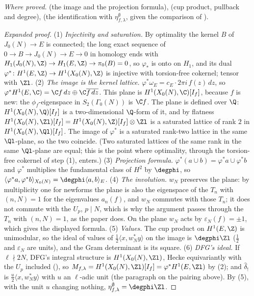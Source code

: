 \begin{sloppypar}
\noindent\emph{Where proved.}  (the image and the projection formula),  (cup product, pullback and degree),  (the
identification with $\eta^\emptyset_{f,\lambda}$, given the comparison of ).

\begin{proof}[Expanded proof]
(1) \emph{Injectivity and saturation.} By optimality the kernel $B$ of $J_0(N)\to E$ is connected; the long exact sequence of $0\to B\to J_0(N)\to E\to0$ in homology ends with
$H_1(J_0(N),\Z)\to H_1(E,\Z)\to\pi_0(B)=0$, so $\varphi_*$ is onto on $H_1$, and its dual $\varphi^*\colon H^1(E,\Z)\to H^1(X_0(N),\Z)$ is injective with torsion-free cokernel; tensor with $\Zl$.
(2) \emph{The image is the kernel lattice.} $\varphi^*\omega_E=c_E\cdot2\pi i\,f(z)\,dz$, so $\varphi^*H^1(E,\C)=\C f\,dz\oplus\C\overline{f\,dz}$. This plane is $H^1(X_0(N),\C)[I_f]$, because $f$ is new: the
$\phi_f$-eigenspace in $S_2(\Gamma_0(N))$ is $\C f$. The plane is defined over $\Q$: $H^1(X_0(N),\Q)[I_f]$ is a two-dimensional $\Q$-form of it, and by flatness
$H^1(X_0(N),\Zl)[I_f]=H^1(X_0(N),\Z)[I_f]\otimes\Zl$ is a saturated lattice of rank $2$ in $H^1(X_0(N),\Ql)[I_f]$. The image of $\varphi^*$ is a saturated rank-two lattice in the same
$\Ql$-plane, so the two coincide. (Two saturated lattices of the same rank in the same $\Ql$-plane are equal; this is the point where optimality,
through the torsion-free cokernel of step (1), enters.) (3) \emph{Projection formula.} $\varphi^*(a\cup b)=\varphi^*a\cup\varphi^*b$ and $\varphi^*$ multiplies the fundamental
class of $H^2$ by $\degphi$, so $\langle\varphi^*a,\varphi^*b\rangle_{X_0(N)}=\degphi\langle a,b\rangle_E$. (4) \emph{The involution.} $w_N$ preserves the plane: by multiplicity one for newforms the
plane is also the eigenspace of the $T_n$ with $(n,N)=1$ for the eigenvalues $a_n(f)$, and $w_N$ commutes with those $T_n$; it does not commute with the $U_p$, $p\mid N$, which is why the
argument passes through the $T_n$ with $(n,N)=1$, as the paper does. On the plane $w_N$ acts by
$\varepsilon_N(f)=\pm1$, which gives the displayed formula. (5) \emph{Values.} The cup product on $H^1(E,\Z)$ is unimodular, so the ideal of values of $\frac12\langle x,w_N^*y\rangle$ on the
image is $\degphi\Zl$ ($\frac12$ and $\varepsilon_N$ are units), and the Gram determinant is its square. (6) \emph{DFG's ideal.} If $\ell\nmid2N$, DFG's integral structure is $H^1(X_0(N),\Zl)$, Hecke equivariantly with the $U_p$ included
(), so $M_{f,\lambda}=H^1(X_0(N),\Zl)[I_f]=\varphi^*H^1(E,\Zl)$ by (2); and $\hat\delta_!$ is $\frac u2\langle x,w_N^*y\rangle$ with $u$ an $\ell$-adic unit (the paragraph on the
pairing above). By (5), with the unit $u$ changing nothing, $\eta^\emptyset_{f,\lambda}=\degphi\Zl$.
\end{proof}


\end{sloppypar}
